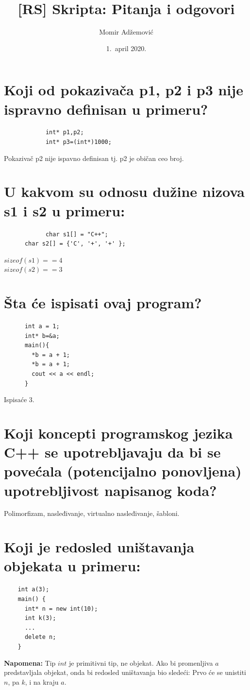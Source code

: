 \documentclass[a4paper]{article}
\begin{document}
\title{[RS] Skripta: Pitanja i odgovori}

\author{Momir Adžemović}

\date{1.~april 2020.}

\maketitle

\tableofcontents

\section{Koji od pokazivača p1, p2 i p3 nije ispravno definisan u primeru?}
		 \begin{lstlisting}
			int* p1,p2;
			int* p3=(int*)1000;\end{lstlisting}
		Pokazivač p2 nije ispavno definisan tj. p2 je običan ceo broj.

\section{U kakvom su odnosu dužine nizova s1 i s2 u primeru:}
		\begin{lstlisting}
			char s1[] = "C++";
      char s2[] = {'C', '+', '+' };\end{lstlisting}
      $sizeof(s1) == 4$\\
      $sizeof(s2) == 3$
    
\section{Šta će ispisati ovaj program?}
    \begin{lstlisting}
      int a = 1;
      int* b=&a;
      main(){
        *b = a + 1;
        *b = a + 1;
        cout << a << endl;
      }\end{lstlisting}

    Ispisaće 3.

\section{Koji koncepti programskog jezika C++ se upotrebljavaju da bi se 
         povećala (potencijalno ponovljena) upotrebljivost napisanog koda?}
    Polimorfizam, nasleđivanje, virtualno nasleđivanje, šabloni.

\section{Koji je redosled uništavanja objekata u primeru:}
    \begin{lstlisting}
    int a(3);
    main() {
      int* n = new int(10);
      int k(3);
      ...
      delete n;
    }\end{lstlisting}
    \textbf{Napomena:} Tip $int$ je primitivni tip, ne objekat. Ako bi promenljiva $a$ predstavljala objekat, 
    onda bi redosled uništavanja bio sledeći: Prvo će se unistiti $n$, pa $k$, i na kraju $a$.
\end{document}
